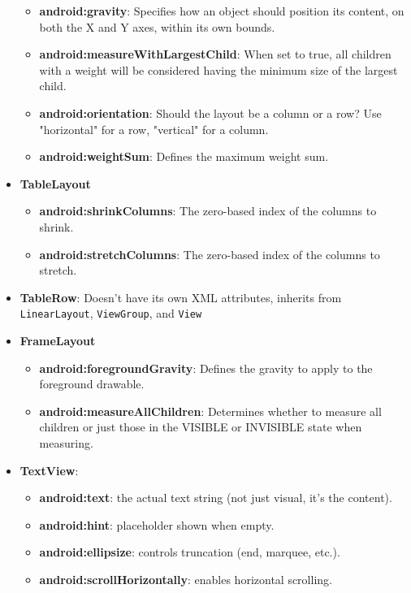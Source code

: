 \documentclass{report}
\begin{document}
\begin{itemize}
\begin{itemize}
                \item \textbf{android:gravity}:	Specifies how an object should position its content, on both the X and Y axes, within its own bounds. 
                \item \textbf{android:measureWithLargestChild}:	When set to true, all children with a weight will be considered having the minimum size of the largest child. 
                \item \textbf{android:orientation}:	Should the layout be a column or a row? Use "horizontal" for a row, "vertical" for a column. 
                \item \textbf{android:weightSum}: Defines the maximum weight sum.  
            \end{itemize}
        \item \textbf{TableLayout}
            \begin{itemize}
                \item \textbf{android:shrinkColumns}:	The zero-based index of the columns to shrink. 
                \item \textbf{android:stretchColumns}:	The zero-based index of the columns to stretch. 
            \end{itemize}
        \item \textbf{TableRow}: Doesn't have its own XML attributes, inherits from \texttt{LinearLayout}, \texttt{ViewGroup}, and \texttt{View}
        \item \textbf{FrameLayout}
            \begin{itemize}
                \item \textbf{android:foregroundGravity}:	Defines the gravity to apply to the foreground drawable. 
                \item \textbf{android:measureAllChildren}:	Determines whether to measure all children or just those in the VISIBLE or INVISIBLE state when measuring. 
            \end{itemize}
        \item \textbf{TextView}: 
            \begin{itemize}
                \item \textbf{android:text}: the actual text string (not just visual, it's the content).
                \item \textbf{android:hint}: placeholder shown when empty.
                \item \textbf{android:ellipsize}: controls truncation (end, marquee, etc.).
                \item \textbf{android:scrollHorizontally}: enables horizontal scrolling.

\end{itemize}
\end{itemize}
\end{document}
